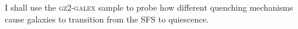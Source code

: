 I shall use the \textsc{gz2-galex} sample to probe how different quenching mechanisms cause galaxies to transition from the SFS to quiescence. 

